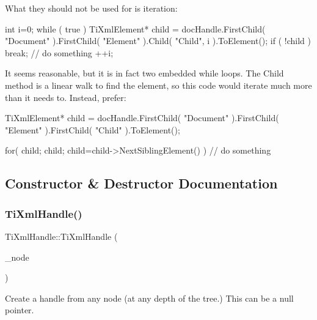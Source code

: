 What they should not be used for is iteration\+:

\begin{DoxyVerb}int i=0; 
while ( true )
{
    TiXmlElement* child = docHandle.FirstChild( "Document" ).FirstChild( "Element" ).Child( "Child", i ).ToElement();
    if ( !child )
        break;
    // do something
    ++i;
}
\end{DoxyVerb}


It seems reasonable, but it is in fact two embedded while loops. The Child method is a linear walk to find the element, so this code would iterate much more than it needs to. Instead, prefer\+:

\begin{DoxyVerb}TiXmlElement* child = docHandle.FirstChild( "Document" ).FirstChild( "Element" ).FirstChild( "Child" ).ToElement();

for( child; child; child=child->NextSiblingElement() )
{
    // do something
}
\end{DoxyVerb}
 

\subsection{Constructor \& Destructor Documentation}
\mbox{\label{class_ti_xml_handle_aba18fd7bdefb942ecdea4bf4b8e29ec8}} 
\subsubsection{\texorpdfstring{Ti\+Xml\+Handle()}{TiXmlHandle()}\hspace{0.1cm}{\footnotesize\ttfamily [1/2]}}
{\footnotesize\ttfamily Ti\+Xml\+Handle\+::\+Ti\+Xml\+Handle (\begin{DoxyParamCaption}\item[{\hyperlink{class_ti_xml_node}{Ti\+Xml\+Node} $\ast$}]{\+\_\+node }\end{DoxyParamCaption})\hspace{0.3cm}{\ttfamily [inline]}}



Create a handle from any node (at any depth of the tree.) This can be a null pointer. 

\mbox{\label{class_ti_xml_handle_a236d7855e1e56ccc7b980630c48c7fd7}} 
